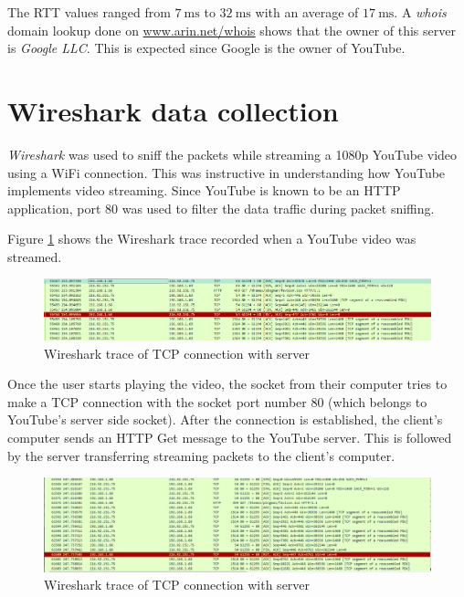 The \gls{RTT} values ranged from $7~\mathrm{ms}$ to $32~\mathrm{ms}$ with an average of $17~\mathrm{ms}$. A \textit{whois} domain lookup done on \url{www.arin.net/whois} shows that the owner of this server is \textit{Google LLC}. This is expected since Google is the owner of YouTube.

\section{Wireshark data collection} \label{sec:simul:wireshark}
\textit{Wireshark} was used to sniff the packets while streaming a 1080p YouTube video using a \gls{WiFi} connection. This was instructive in understanding how YouTube implements video streaming. Since YouTube is known to be an \gls{HTTP} application, port 80 was used to filter the data traffic during packet sniffing.

Figure \ref{fig:sim:w1} shows the Wireshark trace recorded when a YouTube video was streamed.

\begin{figure}[H]
	\centering
	\includegraphics[scale=0.45]{Figures/image3.png}
	\caption{Wireshark trace of TCP connection with server}
	\label{fig:sim:w1}
\end{figure}

Once the user starts playing the video, the socket from their computer tries to make a \gls{TCP} connection with the socket port number 80 (which belongs to YouTube's server side socket). After the connection is established, the client's computer sends an \gls{HTTP} Get message to the YouTube server. This is followed by the server transferring streaming packets to the client's computer.

\begin{figure}[H]
	\centering
	\includegraphics[scale=0.45]{Figures/image2.png}
	\caption[Wireshark trace of TCP connection with YouTube server]{Wireshark trace of \gls{TCP} connection with server}
	\label{fig:sim:w2}
\end{figure}

